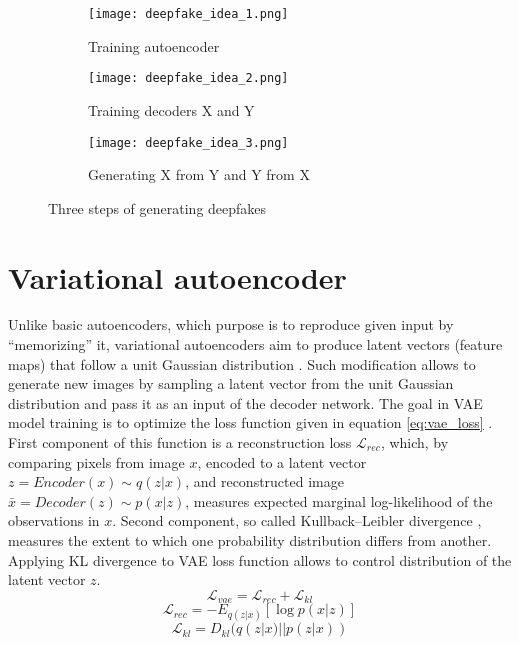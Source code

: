\begin{figure}[H]
\centering
\begin{subfigure}{12cm}
\texttt{[image: deepfake\_idea\_1.png]}
\caption{Training autoencoder}
\label{subfig:deepfake_steps_a}
\end{subfigure}

\begin{subfigure}{12cm}
\texttt{[image: deepfake\_idea\_2.png]}
\caption{Training decoders X and Y}
\label{subfig:deepfake_steps_b}
\end{subfigure}

\begin{subfigure}{12cm}
\texttt{[image: deepfake\_idea\_3.png]}
\caption{Generating X from Y and Y from X}
\label{subfig:deepfake_steps_c}
\end{subfigure}

\caption{Three steps of generating deepfakes}
\label{fig:deepfake_steps}
\end{figure}

\newpage
\section{Variational autoencoder}
\label{Variational_autoencoder}
Unlike basic autoencoders, which purpose is to reproduce given input by ``memorizing'' it, variational autoencoders aim to produce latent vectors (feature maps) that follow a unit Gaussian distribution \cite{variational_bayes_bib}. Such modification allows to generate new images by sampling a latent vector from the unit Gaussian distribution and pass it as an input of the decoder network. The goal in VAE model training is to optimize the loss function given in equation \ref{eq:vae_loss} \cite{vae_loss_bib}. First component of this function is a reconstruction loss \(\mathcal{L}_{rec}\), which, by comparing pixels from image \(x\), encoded to a latent vector \(z = Encoder(x) \sim q(z|x)\), and reconstructed image \(\bar{x} = Decoder(z) \sim p(x|z)\), measures expected marginal log-likelihood of the observations in \(x\). Second component, so called Kullback–Leibler divergence \cite{kl_divergence_bib}, measures the extent to which one probability distribution differs from another. Applying KL divergence to VAE loss function allows to control distribution of the latent vector \(z\).
%
\begin{equation}
\label{eq:vae_loss}
\mathcal{L}_{vae} = \mathcal{L}_{rec} + \mathcal{L}_{kl}
\end{equation}
%
\begin{equation}
\label{eq:rec_loss}
\mathcal{L}_{rec} = -E_{q(z|x)}[\log{p(x|z)}]
\end{equation}
%
\begin{equation}
\label{eq:kl_loss}
\mathcal{L}_{kl} = D_{kl}(q(z|x)||p(z|x))
\end{equation}

